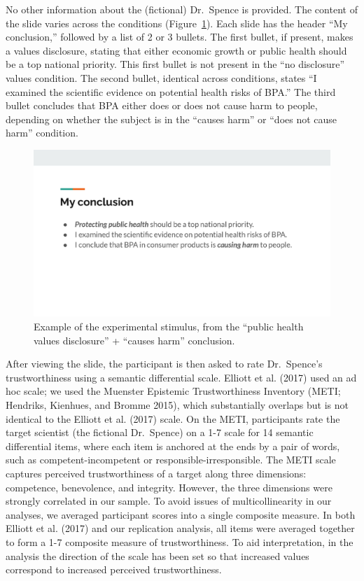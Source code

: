 \documentclass[
  letterpaper,
  DIV=11,
  numbers=noendperiod]{scrartcl}
\begin{document}
No other information about the (fictional) Dr.~Spence is provided. The
content of the slide varies across the conditions
(Figure~\ref{fig-stimulus}). Each slide has the header ``My
conclusion,'' followed by a list of 2 or 3 bullets. The first bullet, if
present, makes a values disclosure, stating that either economic growth
or public health should be a top national priority. This first bullet is
not present in the ``no disclosure'' values condition. The second
bullet, identical across conditions, states ``I examined the scientific
evidence on potential health risks of BPA.'' The third bullet concludes
that BPA either does or does not cause harm to people, depending on
whether the subject is in the ``causes harm'' or ``does not cause harm''
condition.

\begin{figure}

{\centering \includegraphics{fig1_stimulus.png}

}

\caption{\label{fig-stimulus}Example of the experimental stimulus, from
the ``public health values disclosure'' + ``causes harm'' conclusion.}

\end{figure}

After viewing the slide, the participant is then asked to rate
Dr.~Spence's trustworthiness using a semantic differential scale.
Elliott et al. (2017) used an ad hoc scale; we used the Muenster
Epistemic Trustworthiness Inventory (METI; Hendriks, Kienhues, and
Bromme 2015), which substantially overlaps but is not identical to the
Elliott et al. (2017) scale. On the METI, participants rate the target
scientist (the fictional Dr.~Spence) on a 1-7 scale for 14 semantic
differential items, where each item is anchored at the ends by a pair of
words, such as competent-incompetent or responsible-irresponsible. The
METI scale captures perceived trustworthiness of a target along three
dimensions: competence, benevolence, and integrity. However, the three
dimensions were strongly correlated in our sample. To avoid issues of
multicollinearity in our analyses, we averaged participant scores into a
single composite measure. In both Elliott et al. (2017) and our
replication analysis, all items were averaged together to form a 1-7
composite measure of trustworthiness. To aid interpretation, in the
analysis the direction of the scale has been set so that increased
values correspond to increased perceived trustworthiness.
\end{document}
